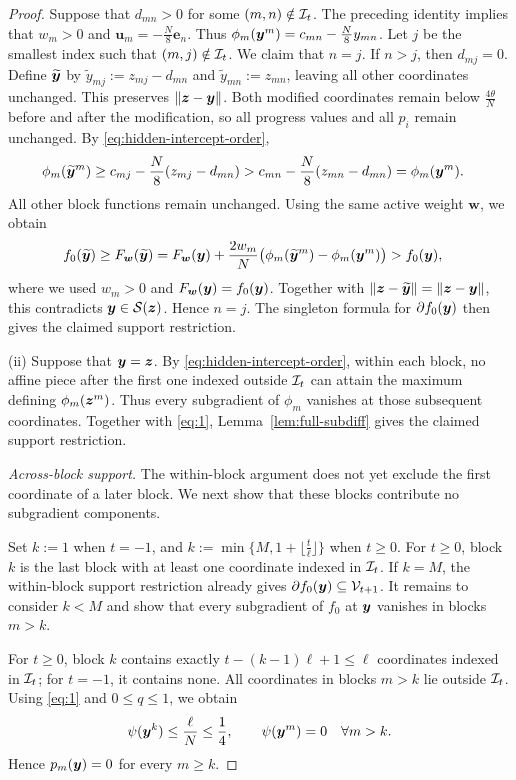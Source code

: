 \begin{proof}
Suppose that $d_{mn}>0$ for some
$(m,n)\notin{\cal I}_t$.
The preceding identity implies that
$w_m>0$ and $\bm u_m=-\tfrac N8\bm e_n$.
Thus
$\phi_m(\bm{y}^m)=c_{mn}-\tfrac N8y_{mn}$.
Let $j$ be the smallest index such that
$(m,j)\notin{\cal I}_t$. We claim that $n=j$.
If $n>j$, then $d_{mj}=0$.
Define $\widetilde{\bm{y}}$ by
$\widetilde y_{mj}:=z_{mj}-d_{mn}$ and
$\widetilde y_{mn}:=z_{mn}$,
leaving all other coordinates unchanged.
This preserves $\|\bm{z}-\bm{y}\|$.
Both modified coordinates remain below
$\tfrac{4\theta}{N}$ before and after the modification,
so all progress values and all $p_i$ remain unchanged.
By \eqref{eq:hidden-intercept-order},
\[
\begin{aligned}
 \phi_m(\widetilde{\bm{y}}^m)
 &\ge c_{mj}-\frac N8(z_{mj}-d_{mn})
 >c_{mn}-\frac N8(z_{mn}-d_{mn})
 =\phi_m(\bm{y}^m).
\end{aligned}
\]
All other block functions remain unchanged.
Using the same active weight $\bm w$, we obtain
\[
\begin{aligned}
 f_0(\widetilde{\bm{y}})
 &\ge F_{\bm w}(\widetilde{\bm{y}})
 =F_{\bm w}(\bm{y})
   +\frac{2w_m}{N}
    \bigl(\phi_m(\widetilde{\bm{y}}^m)-\phi_m(\bm{y}^m)\bigr)
 >f_0(\bm{y}),
\end{aligned}
\]
where we used $w_m>0$ and $F_{\bm w}(\bm{y})=f_0(\bm{y})$.
Together with $\|\bm{z}-\widetilde{\bm{y}}\|=\|\bm{z}-\bm{y}\|$,
this contradicts $\bm{y}\in\mathcal S(\bm{z})$.
Hence $n=j$.
The singleton formula for $\partial f_0(\bm{y})$
then gives the claimed support restriction.

\textrm{(ii)} Suppose that $\bm{y}=\bm{z}$.
By \eqref{eq:hidden-intercept-order}, within each
block, no affine piece after the first one indexed
outside ${\cal I}_t$ can attain the maximum defining
$\phi_m(\bm{z}^m)$.
Thus every subgradient of $\phi_m$ vanishes
at those subsequent coordinates.
Together with \eqref{eq:1},
Lemma~\ref{lem:full-subdiff} gives the claimed
support restriction.

\emph{Across-block support.}
The within-block argument does not yet exclude
the first coordinate of a later block.
We next show that these blocks contribute no
subgradient components.

Set $k:=1$ when $t=-1$, and
$k:=\min\{M,1+\lfloor\tfrac{t}{\ell}\rfloor\}$
when $t\ge0$.
For $t\ge0$, block $k$ is the last block with
at least one coordinate indexed in ${\cal I}_t$.
If $k=M$, the within-block support restriction
already gives $\partial f_0(\bm{y})\subseteq{\cal V}_{t+1}$.
It remains to consider $k<M$ and show that
every subgradient of $f_0$ at $\bm{y}$ vanishes
in blocks $m>k$.

For $t\ge0$, block $k$ contains exactly
$t-(k-1)\ell+1\le\ell$ coordinates indexed
in ${\cal I}_t$; for $t=-1$, it contains none.
All coordinates in blocks $m>k$ lie outside
${\cal I}_t$.
Using \eqref{eq:1} and $0\le q\le1$, we obtain
\[
 \psi(\bm{y}^k)\le\frac{\ell}{N}\le\frac14,
 \qquad
 \psi(\bm{y}^m)=0 \quad \forall m>k.
\]
Hence $p_m(\bm{y})=0$ for every $m\ge k$.


\end{proof}
